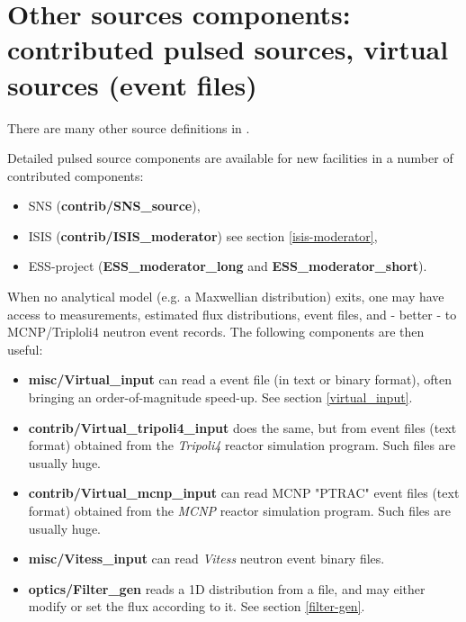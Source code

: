 \newpage








\newpage




\newpage




\newpage




\newpage
\section{Other sources components: contributed pulsed sources, virtual sources (event files)}
\label{sources-seealso}

There are many other source definitions in \MCS .

Detailed pulsed source components are available for new facilities
in a number of contributed components:
\begin{itemize}
\item SNS ({\bf contrib/SNS\_source}),
\item ISIS ({\bf contrib/ISIS\_moderator}) see section \ref{isis-moderator},
\item ESS-project ({\bf ESS\_moderator\_long} and {\bf  ESS\_moderator\_short}).
\end{itemize}

When no analytical model (e.g. a Maxwellian distribution) exits,
one may have access to measurements, estimated flux distributions,
event files, and - better - to MCNP/Triploli4 neutron event records.
The following components are then useful:

\begin{itemize}
\item{{\bf misc/Virtual\_input} can read a \MCS event file
(in text or binary format), often bringing an order-of-magnitude speed-up.
See section \ref{virtual_input}.}
\item{{\bf contrib/Virtual\_tripoli4\_input} does the same, but from event files (text format) obtained from the \emph{Tripoli4} \cite{tripoli_webpage} reactor simulation program. Such files are usually huge.}
\item{{\bf contrib/Virtual\_mcnp\_input} can read MCNP "PTRAC" event files (text format) obtained from the \emph{MCNP} \cite{mcnp_webpage} reactor simulation program. Such files are usually huge.}
\item{{\bf misc/Vitess\_input} can read \emph{Vitess} \cite{vitess_webpage} neutron event binary files.}
\item{{\bf optics/Filter\_gen} reads a 1D distribution from a file, and may either modify or set the flux according to it. See section \ref{filter-gen}.}
\end{itemize}
